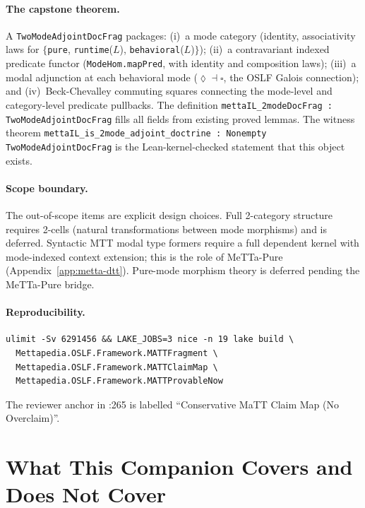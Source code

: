 \documentclass[11pt]{article}
\newcommand{\code}[1]{\texttt{#1}}
\newcommand{\codepath}[1]{\path{#1}}
\begin{document}
\paragraph{The capstone theorem.}
A \code{TwoModeAdjointDocFrag} packages:
(i)~a mode category (identity, associativity laws for $\{$\texttt{pure},
\texttt{runtime}($L$), \texttt{behavioral}($L$)$\}$);
(ii)~a contravariant indexed predicate functor (\code{ModeHom.mapPred},
with identity and composition laws);
(iii)~a modal adjunction at each behavioral mode ($\lozenge \dashv \square$,
the OSLF Galois connection); and
(iv)~Beck-Chevalley commuting squares connecting the mode-level and
category-level predicate pullbacks.
The definition \code{mettaIL\_2modeDocFrag : TwoModeAdjointDocFrag}
fills all fields from existing proved lemmas.
The witness theorem \code{mettaIL\_is\_2mode\_adjoint\_doctrine :
Nonempty TwoModeAdjointDocFrag} is the Lean-kernel-checked statement
that this object exists.

\paragraph{Scope boundary.}
The out-of-scope items are explicit design choices.
Full 2-category structure requires 2-cells (natural transformations between
mode morphisms) and is deferred.
Syntactic MTT modal type formers require a full dependent kernel with
mode-indexed context extension; this is the role of MeTTa-Pure
(Appendix~\ref{app:metta-dtt}).
Pure-mode morphism theory is deferred pending the MeTTa-Pure bridge.

\paragraph{Reproducibility.}
\begin{lstlisting}[language={},caption={Build command for MaTT targets}]
ulimit -Sv 6291456 && LAKE_JOBS=3 nice -n 19 lake build \
  Mettapedia.OSLF.Framework.MATTFragment \
  Mettapedia.OSLF.Framework.MATTClaimMap \
  Mettapedia.OSLF.Framework.MATTProvableNow
\end{lstlisting}

The reviewer anchor in
\codepath{Mettapedia/OSLF/SpecIndex.lean}:265 is labelled
``Conservative MaTT Claim Map (No Overclaim)''.

\section{What This Companion Covers and Does Not Cover}
\end{document}
